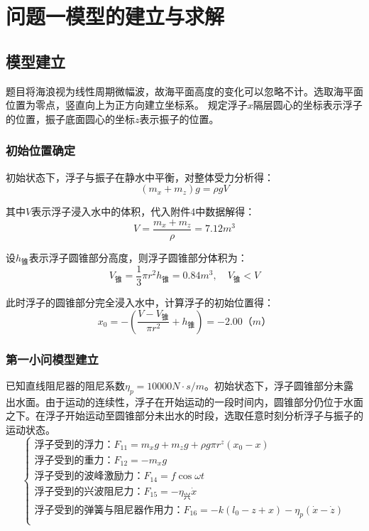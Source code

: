 \documentclass{article}
\numberwithin{equation}{subsection}
\begin{document}
{\centering\section{问题一模型的建立与求解}}

\subsection{模型建立}
题目将海浪视为线性周期微幅波，故海平面高度的变化可以忽略不计。选取海平面位置为零点，竖直向上为正方向建立坐标系。
规定浮子$x$隔层圆心的坐标表示浮子的位置，振子底面圆心的坐标$z$表示振子的位置。

\subsubsection{初始位置确定}

初始状态下，浮子与振子在静水中平衡，对整体受力分析得：
\begin{equation}
(m_x+m_z)g=\rho gV
\end{equation}

其中$V$表示浮子浸入水中的体积，代入附件4中数据解得：
$$V=\frac{m_x+m_z}{\rho }=7.12m^3$$

设$h_{\text{锥}}$表示浮子圆锥部分高度，则浮子圆锥部分体积为：
$$V_{\text{锥}}=\frac{1}{3} \pi r^2h_{\text{锥}}=0.84m^3,\quad V_{\text{锥}}<V$$

此时浮子的圆锥部分完全浸入水中，计算浮子的初始位置得：
\begin{equation}
    x_0=-\left(\frac{V-V_{\text{锥}}}{\pi r^2}+h_{\text{锥}}\right)=-2.00（m）
\end{equation}

\subsubsection{第一小问模型建立}
已知直线阻尼器的阻尼系数$\eta _{p}=10000 N·s/m$。初始状态下，浮子圆锥部分未露出水面。由于运动的连续性，浮子在开始运动的一段时间内，圆锥部分仍位于水面之下。在浮子开始运动至圆锥部分未出水的时段，选取任意时刻分析浮子与振子的运动状态。
\begin{equation}
\left\{\begin{array}{l}
   \text{浮子受到的浮力：}F_{11}=m_{x} g +m_{z} g+\rho g \pi r^{z}\left(x_{0}-x\right)\\
   \text{浮子受到的重力：}F_{12}=-m_{x} g\\
   \text{浮子受到的波峰激励力：}F_{14}=f \cos \omega t\\
   \text{浮子受到的兴波阻尼力：}F_{15}=-\eta_{\text{兴}} \dot{x}\\
   \text{浮子受到的弹簧与阻尼器作用力：}F_{16}=-k\left(l_{0}-z+x\right)-\eta_{p}(\dot{x}-\dot{z})\\
\end{array}\right.
\end{equation}
\end{document}
